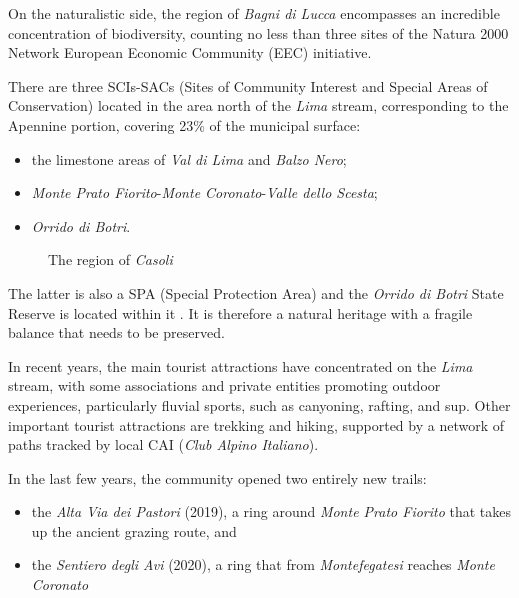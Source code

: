 \documentclass[sustainability,article,submit,pdftex,moreauthors]{Definitions/mdpi}
\begin{document}
On the naturalistic side, the region of \emph{Bagni di Lucca} encompasses an incredible concentration of biodiversity, counting no less than three sites of the Natura 2000 Network  European Economic Community (EEC) initiative.

There are three SCIs-SACs (Sites of Community Interest and Special Areas of Conservation) located in the area north of the \emph{Lima} stream, corresponding to the Apennine portion, covering 23\% of the municipal surface:
\begin {itemize}
\item the limestone areas of \emph{Val di Lima} and \emph{Balzo Nero}; 
\item \emph{Monte Prato Fiorito}-\emph{Monte Coronato}-\emph{Valle dello
Scesta}; 
\item \emph{Orrido di Botri}.
\end{itemize}


\begin{figure}
\hfill
{}
\hfill
{}
\caption[The region of \emph{Casoli}]{The region of \emph{Casoli}}
\label{fig:toscana-casoli}
\end{figure}

The latter is also a SPA (Special Protection Area) and the \textit{Orrido di Botri} State Reserve is located within it . It is therefore a natural heritage with a fragile balance that needs to be preserved.

In recent years, the main tourist attractions have concentrated on the \emph{Lima} stream, with some associations and private entities promoting outdoor experiences, particularly fluvial sports, such as canyoning, rafting, and sup. Other important tourist attractions are trekking and hiking, supported by a network of paths tracked by local CAI (\textit{Club Alpino Italiano}).

In the last few years, the community opened two entirely new trails:
\begin{itemize}
	\item the \textit{Alta Via dei Pastori} (2019), a ring around \textit{Monte Prato Fiorito} that takes up the ancient grazing route, and
	\item the \textit{Sentiero degli Avi} (2020), a ring that from \textit{Montefegatesi}
	reaches \textit{Monte Coronato} \cite{pin21}
\end{itemize}
\end{document}
